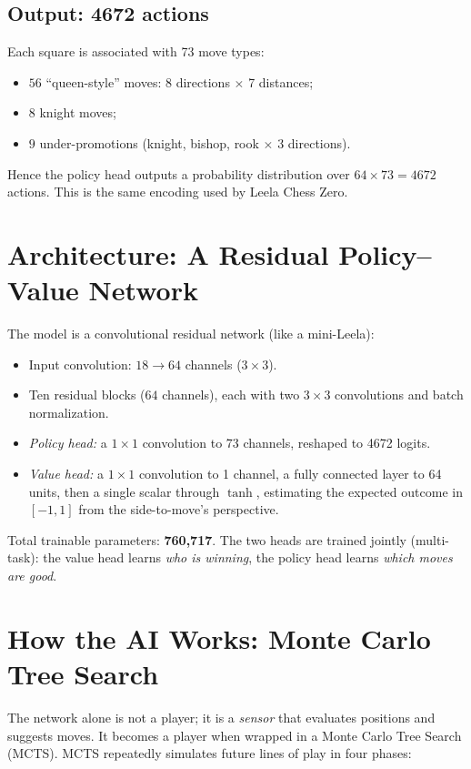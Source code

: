 \documentclass[11pt,a4paper]{article}
\begin{document}
\subsection{Output: 4672 actions}
Each square is associated with 73 move types:
\begin{itemize}
  \item $56$ ``queen-style'' moves: 8 directions $\times$ 7 distances;
  \item $8$ knight moves;
  \item $9$ under-promotions (knight, bishop, rook $\times$ 3 directions).
\end{itemize}
Hence the policy head outputs a probability distribution over
$64\times73=4672$ actions. This is the same encoding used by Leela Chess Zero.

\section{Architecture: A Residual Policy--Value Network}

The model is a convolutional residual network (like a mini-Leela):
\begin{itemize}
  \item Input convolution: $18\rightarrow64$ channels ($3\times3$).
  \item Ten residual blocks ($64$ channels), each with two $3\times3$ convolutions
        and batch normalization.
  \item \emph{Policy head:} a $1\times1$ convolution to 73 channels, reshaped
        to 4672 logits.
  \item \emph{Value head:} a $1\times1$ convolution to 1 channel, a fully
        connected layer to 64 units, then a single scalar through $\tanh$,
        estimating the expected outcome in $[-1,1]$ from the side-to-move's
        perspective.
\end{itemize}
Total trainable parameters: \textbf{760,717}. The two heads are trained
jointly (multi-task): the value head learns \emph{who is winning}, the policy
head learns \emph{which moves are good}.

\section{How the AI Works: Monte Carlo Tree Search}

The network alone is not a player; it is a \emph{sensor} that evaluates
positions and suggests moves. It becomes a player when wrapped in a Monte
Carlo Tree Search (MCTS). MCTS repeatedly simulates future lines of play in
four phases:
\end{document}
